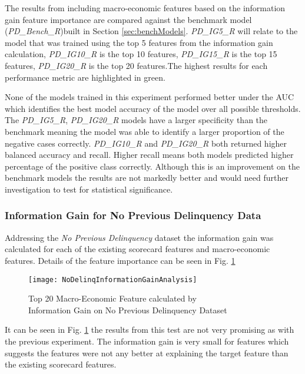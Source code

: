 The results from including macro-economic features based on the information gain feature importance are compared against the benchmark model (\textit{PD\_Bench\_R})built in Section \ref{sec:benchModels}. \textit{PD\_IG5\_R} will relate to the model that was trained using the top 5 features from the information gain calculation, \textit{PD\_IG10\_R} is the top 10 features, \textit{PD\_IG15\_R} is the top 15 features, \textit{PD\_IG20\_R} is the top 20 features.The highest results for each performance metric are highlighted in green.

None of the models trained in this experiment performed better under the AUC which identifies the best model accuracy of the model over all possible thresholds. The \textit{PD\_IG5\_R}, \textit{PD\_IG20\_R} models have a larger specificity than the benchmark meaning the model was able to identify a larger proportion of the negative cases correctly. \textit{PD\_IG10\_R} and \textit{PD\_IG20\_R} both returned higher balanced accuracy and recall. Higher recall means both models predicted higher percentage of the positive class correctly. Although this is an improvement on the benchmark models the results are not markedly better and would need further investigation to test for statistical significance.

\subsubsection{Information Gain for No Previous Delinquency Data}\label{IGNPDExper}
Addressing the \textit{No Previous Delinquency} dataset the information gain was calculated for each of the existing scorecard features and macro-economic features. Details of the feature importance can be seen in Fig. \ref{fig:NoDelinqInformationGainAnalysis}

\begin{figure}[H]
	\texttt{[image: NoDelinqInformationGainAnalysis]}
	\caption{Top 20 Macro-Economic Feature calculated by \\ Information Gain on No Previous Delinquency Dataset}
	\label{fig:NoDelinqInformationGainAnalysis}
\end{figure}

It can be seen in Fig. \ref{fig:NoDelinqInformationGainAnalysis} the results from this test are not very promising as with the previous experiment. The information gain is very small for features which suggests the features were not any better at explaining the target feature than the existing scorecard features. 

